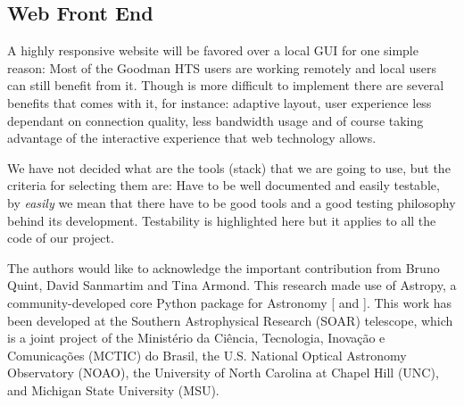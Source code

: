 \documentclass[11pt,twoside]{article}
\begin{document}
\subsection{Web Front End}
A highly responsive website will be favored over a local GUI for one simple reason: Most of the Goodman HTS users are working remotely and local users can still benefit from it. Though is more difficult to implement there are several benefits that comes with it, for instance: adaptive layout, user experience less dependant on connection quality, less bandwidth usage and of course taking advantage of the interactive experience that web technology allows.

We have not decided what are the tools (stack) that we are going to use, but the criteria for selecting them are: Have to be well documented and easily testable, by \emph{easily} we mean that there have to be good tools and a good testing philosophy behind its development. Testability is highlighted here but it applies to all the code of our project.


\acknowledgements The authors would like to acknowledge the important contribution from Bruno Quint, David Sanmartim and Tina Armond. This research made use of Astropy, a community-developed core Python package for Astronomy [\citet{2013A&A...558A..33A} and \citet{2018AJ....156..123A}]. This work has been developed at the Southern Astrophysical Research (SOAR) telescope, which is a joint project of the Minist\'erio da Ci\^encia, Tecnologia, Inova\c{c}\~ao e Comunica\c{c}\~oes (MCTIC) do Brasil, the U.S. National Optical Astronomy Observatory (NOAO), the University of North Carolina at Chapel Hill (UNC), and Michigan State University (MSU). 


\end{document}
